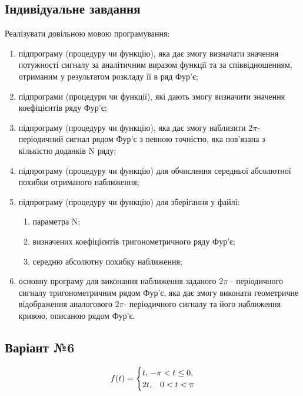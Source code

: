 \documentclass[oneside,14pt]{extarticle}
\begin{document}
\begin{normalsize}
	\section*{Індивідуальне завдання}
	Реалізувати довільною мовою програмування:
	\begin{enumerate}[label=\arabic*)]
		\item підпрограму (процедуру чи функцію), яка дає змогу визначати значення
		потужності сигналу за аналітичним виразом функції та за
		співвідношенням, отриманим у результатом розкладу її в ряд Фур’є;
		\item підпрограми (процедури чи функції), які дають змогу визначити значення
		коефіцієнтів ряду Фур’є;
		\item підпрограму (процедуру чи функцію), яка дає змогу наблизити $2\pi$-
		періодичний сигнал рядом Фур’є з певною точністю, яка пов’язана з
		кількістю доданків N ряду;
		\item підпрограму (процедуру чи функцію) для обчислення середньої
		абсолютної похибки отриманого наближення;
		\item підпрограму (процедуру чи функцію) для зберігання у файлі:
		\begin{enumerate}[label=\alph*)]
			\item параметра N;
			\item визначених коефіцієнтів тригонометричного ряду Фур’є;
			\item середню абсолютну похибку наближення;
		\end{enumerate}
		\item основну програму для виконання наближення заданого $2\pi$ - періодичного
		сигналу тригонометричним рядом Фур'є, яка дає змогу виконати
		геометричне відображення аналогового $2\pi$- періодичного сигналу та його
		наближення кривою, описаною рядом Фур'є.
	\end{enumerate}
	
	\subsection*{Варіант №6}
	
	\begin{equation}
		f(t) = 
		\begin{cases}
			t, & \hspace{-12pt} -\pi < t \leq 0,\\
			2t, & 0 < t < \pi
		\end{cases}\nonumber
	\end{equation}


\end{normalsize}
\end{document}
